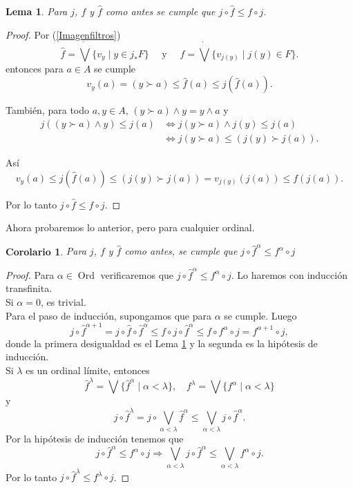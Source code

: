 \documentclass[11pt]{amsart}
\DeclareMathOperator{\Ord}{Ord}
\theoremstyle{plain}
\newtheorem{cor}[thm]{Corolario}
\newtheorem{lem}[thm]{Lema}
\theoremstyle{definition}
\begin{document}
\begin{lem}\label{f1f}
    Para $j$, $f$ y $\hat{f}$ como antes se cumple que $j\circ \hat{f}\leq f\circ j$.
\end{lem}
\begin{proof}
    Por (\ref{Imagenfiltros})
    \[
    \hat{f}=\dot{\bigvee}\{v_y\mid y\in j_*F\}\quad  \mbox{ y } \quad f=\dot{\bigvee}\{v_{j(y)}\mid j(y)\in F\}. 
    \]
entonces para $a\in A$ se cumple
\[
v_y(a)=(y\succ a)\leq \hat{f}(a)\leq j(\hat{f}(a)).
\]

También, para todo $a, y\in A$, $(y\succ a)\wedge y=y\wedge a$ y
\[
\begin{split}
j((y\succ a)\wedge y)\leq j(a) & \Leftrightarrow j(y\succ a)\wedge j(y)\leq j(a)\\
& \Leftrightarrow j(y\succ a)\leq (j(y)\succ j(a)).
\end{split}
\]

Así 
\[
v_y(a)\leq j(\hat{f}(a))\leq (j(y)\succ j(a))=v_{j(y)}(j(a))\leq f(j(a)).
\]

Por lo tanto $j\circ \hat{f}\leq f\circ j$.
\end{proof}

Ahora probaremos lo anterior, pero para cualquier ordinal.

\begin{cor}\label{finftyf}
    Para $j$, $f$ y $\hat{f}$ como antes, se cumple que $j\circ \hat{f}^\alpha\leq f^\alpha\circ j$
\end{cor}

\begin{proof}
    Para $\alpha\in \Ord$ verificaremos que $j\circ \hat{f}^\alpha\leq f^\alpha\circ j$. Lo haremos con inducción transfinita.\\

    Si $\alpha=0$, es trivial.\\

    Para el paso de inducción, supongamos que para $\alpha$ se cumple. Luego
    \[
    j\circ \hat{f}^{\alpha+1}=j\circ \hat{f}\circ \hat{f}^{\alpha}\leq  f\circ j\circ \hat{f}^\alpha\leq f\circ f^\alpha\circ j=f^{\alpha+1}\circ j,
    \]
    donde la primera desigualdad es el Lema \ref{f1f} y la segunda es la hipótesis de inducción.\\

    Si $\lambda$ es un ordinal límite, entonces
	\[
	\hat{f}^\lambda=\bigvee\{\hat{f}^\alpha\mid \alpha<\lambda\}, \quad f^\lambda=\bigvee\{f^\alpha\mid \alpha<\lambda\} 
	\]
	y
	\[
		j\circ \hat{f}^\lambda=j\circ \bigvee_{\alpha<\lambda}\hat{f}^\alpha\leq\bigvee_{\alpha<\lambda}j\circ \hat{f}^\alpha.
	\]
	Por la hipótesis de inducción tenemos que 
	\[
	j\circ \hat{f}^\alpha\leq f^\alpha\circ j\Rightarrow \bigvee_{\alpha<\lambda}j\circ \hat{f}^\alpha\leq \bigvee_{\alpha<\lambda} f^\alpha\circ j.
	\]
	Por lo tanto $j\circ \hat{f}^\lambda\leq f^\lambda\circ j$.
\end{proof}
\end{document}
